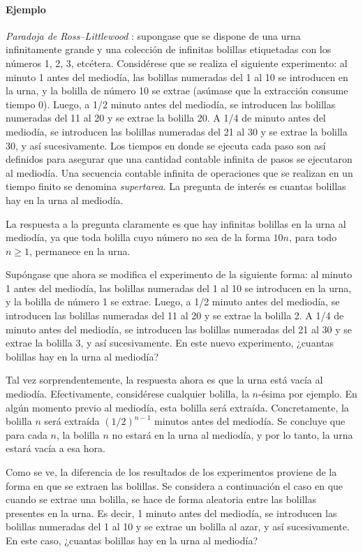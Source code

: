 \documentclass[a4paper]{report}
\begin{document}
\paragraph{Ejemplo} \emph{Paradoja de Ross–Littlewood} \cite{ross2009first9th}: supongase que se dispone de una urna infinitamente grande y una colección de infinitas bolillas etiquetadas con los números 1, 2, 3, etcétera. Considérese que se realiza el siguiente experimento: al minuto 1 antes del mediodía, las bolillas numeradas del 1 al 10 se introducen en la urna, y la bolilla de número 10 se extrae (asúmase que la extracción consume tiempo 0). Luego, a 1/2 minuto antes del mediodía, se introducen las bolillas numeradas del 11 al 20 y se extrae la bolilla 20. A 1/4 de minuto antes del mediodía, se introducen las bolillas numeradas del 21 al 30 y se extrae la bolilla 30, y así sucesivamente. 
Los tiempos en donde se ejecuta cada paso son así definidos para asegurar que una cantidad contable infinita de pasos se ejecutaron al mediodía. Una secuencia contable infinita de operaciones que se realizan en un tiempo finito se denomina \emph{supertarea}. 
La pregunta de interés es cuantas bolillas hay en la urna al mediodía.  

La respuesta a la pregunta claramente es que hay infinitas bolillas en la urna al mediodía, ya que toda bolilla cuyo número no sea de la forma \(10n\), para todo \(n\geq 1\), permanece en la urna.

Supóngase que ahora se modifica el experimento de la siguiente forma: al minuto 1 antes del mediodía, las bolillas numeradas del 1 al 10 se introducen en la urna, y la bolilla de número 1 se extrae. Luego, a 1/2 minuto antes del mediodía, se introducen las bolillas numeradas del 11 al 20 y se extrae la bolilla 2. A 1/4 de minuto antes del mediodía, se introducen las bolillas numeradas del 21 al 30 y se extrae la bolilla 3, y así sucesivamente. En este nuevo experimento, ¿cuantas bolillas hay en la urna al mediodía?

Tal vez sorprendentemente, la respuesta ahora es que la urna está vacía al mediodía. Efectivamente, considérese cualquier bolilla, la \(n\)-ésima por ejemplo. En algún momento previo al mediodía, esta bolilla será extraída. Concretamente, la bolilla \(n\) será extraída \((1/2)^{n-1}\) minutos antes del mediodía. Se concluye que para cada \(n\), la bolilla \(n\) no estará en la urna al mediodía, y por lo tanto, la urna estará vacía a esa hora.

Como se ve, la diferencia de los resultados de los experimentos proviene de la forma en que se extraen las bolillas. Se considera a continuación el caso en que cuando se extrae una bolilla, se hace de forma aleatoria entre las bolillas presentes en la urna. Es decir, 1 minuto antes del mediodía, se introducen las  bolillas numeradas del 1 al 10 y se extrae un bolilla al azar, y así sucesivamente. En este caso, ¿cuantas bolillas hay en la urna al mediodía?
\end{document}
